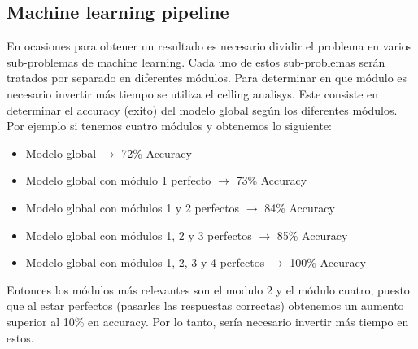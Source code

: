 \documentclass[12pt,a4paper]{article}
\begin{document}
\subsection{Machine learning pipeline}
En ocasiones para obtener un resultado es necesario dividir el problema en varios sub-problemas de machine learning. Cada uno de estos sub-problemas serán tratados por separado en diferentes módulos. Para determinar en que módulo es necesario invertir más tiempo se utiliza el celling analisys. Este consiste en determinar el accuracy (exito) del modelo global según los diferentes módulos. Por ejemplo si tenemos cuatro módulos y obtenemos lo siguiente:

\begin{itemize}
\item Modelo global $\longrightarrow$ 72\% Accuracy
\item Modelo global con módulo 1 perfecto $\longrightarrow$ 73\% Accuracy
\item Modelo global con módulos 1 y 2 perfectos $\longrightarrow$ 84\% Accuracy
\item Modelo global con módulos 1, 2 y 3 perfectos $\longrightarrow$ 85\% Accuracy
\item Modelo global con módulos 1, 2, 3 y 4 perfectos $\longrightarrow$ 100\% Accuracy
\end{itemize}

Entonces los módulos más relevantes son el modulo 2 y el módulo cuatro, puesto que al estar perfectos (pasarles las respuestas correctas) obtenemos un aumento superior al 10\% en accuracy. Por lo tanto, sería necesario invertir más tiempo en estos.
\end{document}
